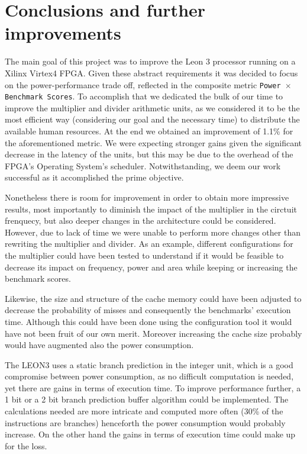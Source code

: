 \section{Conclusions and further improvements}
\label{sec:conclusion}

The main goal of this project was to improve the Leon 3 processor running on a Xilinx Virtex4 FPGA. Given these abstract requirements it was decided to focus on the power-performance trade off, reflected in the composite metric \texttt{Power $\times$ Benchmark Scores}. To accomplish that we dedicated the bulk of our time to improve the multiplier and divider arithmetic units, as we considered it to be the most efficient way (considering our goal and the necessary time) to distribute the available human resources. At the end we obtained an improvement of 1.1\% for the aforementioned metric. We were expecting stronger gains given the significant decrease in the latency of the units, but this may be due to the overhead of the FPGA's Operating System's scheduler. Notwithstanding, we deem our work successful as it accomplished the prime objective.

Nonetheless there is room for improvement in order to obtain more impressive results, most importantly to diminish the impact of the multiplier in the circtuit frenquecy, but also deeper changes in the architecture could be considered. However, due to lack of time we were unable to perform more changes other than rewriting the multiplier and divider.
As an example, different configurations for the multiplier could have been tested to understand if it would be feasible to decrease its impact on frequency, power and area while keeping or increasing the benchmark scores.

Likewise, the size and structure of the cache memory could have been adjusted to decrease the probability of misses and consequently the benchmarks' execution time. Although this could have been done using the configuration tool it would have not been fruit of our own merit. Moreover increasing the cache size probably would have augmented also the power consumption.

The LEON3 uses a static branch prediction in the integer unit, which is a good compromise
between power consumption, as no difficult computation is needed, yet there are gains in terms of execution time.
To improve performance further, a 1 bit or a 2 bit branch prediction buffer
algorithm could be implemented. The calculations needed are more intricate and computed more often (30\% of
the instructions are branches) henceforth the power consumption would probably increase. On the other hand the gains in terms of execution time could make up for the loss.

